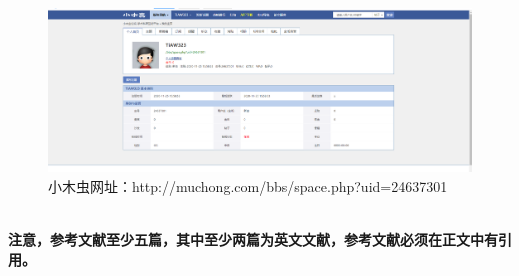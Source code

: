 \documentclass{article}
\begin{document}
	\begin{figure}[h!]
		\centering
		\includegraphics[scale=0.2]{小木虫}
		\caption{小木虫网址：http://muchong.com/bbs/space.php?uid=24637301}
		\label{fig:github}
	\end{figure}


\hspace*{\fill} \\

{\bf 注意，参考文献至少五篇，其中至少两篇为英文文献，参考文献必须在正文中有引用。}


\end{document}
